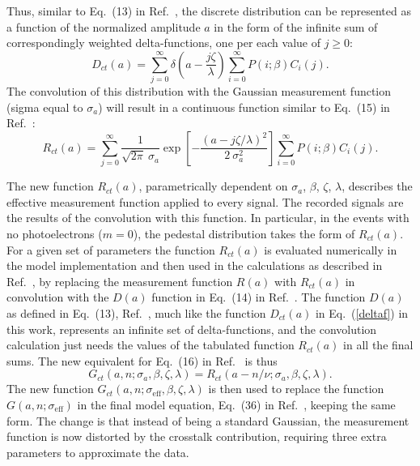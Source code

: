 Thus, similar to Eq.~(13) in Ref.~\cite{DEGTIARENKO20171}, the discrete distribution can be represented as a function of the normalized amplitude $a$ in the form of the infinite sum of correspondingly weighted delta-functions, one per each value of $j \geq 0$:
\begin{equation}
\label{deltaf}
  D_{ct}(a)= \sum\limits_{j=0}^{\infty}
  \delta \left (a - \frac{j\zeta}{\lambda} \right )
   \sum\limits_{i=0}^{\infty} P(i;\beta) C_i(j) .
\end{equation}
The convolution of this distribution with the Gaussian measurement function (sigma equal to $\sigma_a$) will result in a continuous function similar to Eq.~(15) in Ref.~\cite{DEGTIARENKO20171}:
\begin{equation}
\label{RCmodel}
  R_{ct}(a)= \sum\limits_{j=0}^{\infty} \frac{1}{\sqrt{2 \pi} \ \sigma_a} 
  \exp{\left [- \frac{(a - j \zeta / \lambda)^{2}}{2 
\ \sigma_a^{2}} \right ]}
   \sum\limits_{i=0}^{\infty} P(i;\beta) C_i(j) .
\end{equation}

The new function $R_{ct}(a)$, parametrically dependent on $\sigma_a$, $\beta$, $\zeta$, $\lambda$, describes the effective measurement function applied to every signal. The recorded signals are the results of the convolution with this function. In particular, in the events with no photoelectrons ($m=0$), the pedestal distribution takes the form of $R_{ct}(a)$. For a given set of parameters the function $R_{ct}(a)$ is evaluated numerically in the model implementation and then used in the calculations as described in Ref.~\cite{DEGTIARENKO20171}, by replacing the measurement function $R(a)$ with $R_{ct}(a)$ in convolution with the $D(a)$ function in Eq.~(14) in Ref.~\cite{DEGTIARENKO20171}. The function $D(a)$ as defined in Eq.~(13), Ref.~\cite{DEGTIARENKO20171}, much like the function $D_{ct}(a)$ in Eq.~(\ref{deltaf}) in this work, represents an infinite set of delta-functions, and the convolution calculation just needs the values of the tabulated function $R_{ct}(a)$ in all the final sums. The new equivalent for Eq.~(16) in Ref.~\cite{DEGTIARENKO20171} is thus
\begin{equation}
\label{GCmodel}
  G_{ct}(a,n;\sigma_a,\beta,\zeta,\lambda)= R_{ct}(a-n/\nu;\sigma_a,\beta,\zeta,\lambda).
\end{equation}
The new function $G_{ct}(a,n;\sigma_{\mathrm{eff}},\beta,\zeta,\lambda)$ is then used to replace the function $G(a,n;\sigma_{\mathrm{eff}})$ in the final model equation, Eq.~(36) in Ref.~\cite{DEGTIARENKO20171}, keeping the same form. The change is that instead of being a standard Gaussian, the measurement function is now distorted by the crosstalk contribution, requiring three extra parameters to approximate the data.
